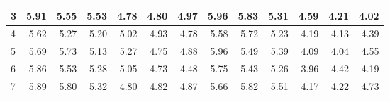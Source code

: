 \begin{table}[]
{{\begin{tabular}{|l|r|r|r|r|r|r|r|r|r|r|r|r|}
3                                                             & 5.91                             & 5.55                              & 5.53                               & 4.78                             & 4.80                              & 4.97                               & 5.96                             & 5.83                              & 5.31                               & 4.59                             & 4.21                              & 4.02                               \\ \hline
4                                                             & 5.62                             & 5.27                              & 5.20                               & 5.02                             & 4.93                              & 4.78                               & 5.58                             & 5.72                              & 5.23                               & 4.19                             & 4.13                              & 4.39                               \\ \hline
5                                                             & 5.69                             & 5.73                              & 5.13                               & 5.27                             & 4.75                              & 4.88                               & 5.96                             & 5.49                              & 5.39                               & 4.09                             & 4.04                              & 4.55                               \\ \hline
6                                                             & 5.86                             & 5.53                              & 5.28                               & 5.05                             & 4.73                              & 4.48                               & 5.75                             & 5.43                              & 5.26                               & 3.96                             & 4.42                              & 4.19                               \\ \hline
7                                                             & 5.89                             & 5.80                              & 5.32                               & 4.80                             & 4.82                              & 4.87                               & 5.66                             & 5.82                              & 5.51                               & 4.17                             & 4.22                              & 4.73                               \\ \hline

\end{tabular}}}
\end{table}
